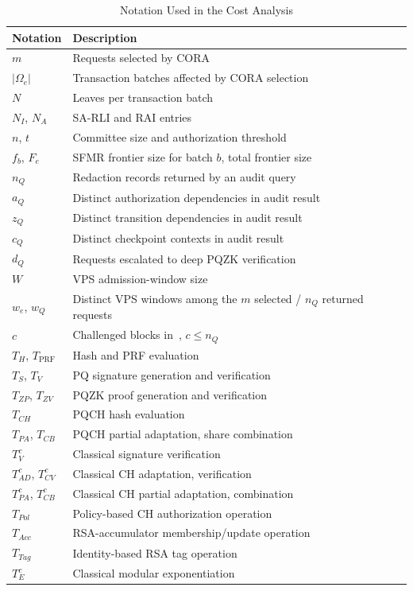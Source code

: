 \documentclass[lettersize,journal]{IEEEtran}
\begin{document}
\begin{table}[t]
\centering
\caption{Notation Used in the Cost Analysis}
\label{tab:cost-notation}
\scriptsize
\renewcommand{\arraystretch}{1.08}
\setlength{\tabcolsep}{3pt}
\begin{tabular}{ll}
\hline
\textbf{Notation} & \textbf{Description} \\
\hline
$m$ & Requests selected by CORA \\
$|\Omega_e|$ & Transaction batches affected by CORA selection \\
$N$ & Leaves per transaction batch \\
$N_I$, $N_A$ & SA-RLI and RAI entries \\
$n$, $t$ & Committee size and authorization threshold \\
$f_b$, $F_e$ & SFMR frontier size for batch $b$, total frontier size \\
$n_Q$ & Redaction records returned by an audit query \\
$a_Q$ & Distinct authorization dependencies in audit result \\
$z_Q$ & Distinct transition dependencies in audit result \\
$c_Q$ & Distinct checkpoint contexts in audit result \\
$d_Q$ & Requests escalated to deep PQZK verification \\
\textcolor{e2}{$W$} & \textcolor{e2}{VPS admission-window size} \\
\textcolor{e2}{$w_e$, $w_Q$} & \textcolor{e2}{Distinct VPS windows among the $m$ selected / $n_Q$ returned requests} \\
$c$ & Challenged blocks in~\cite{ref13}, $c\le n_Q$ \\
\hline
$T_H$, $T_{\mathrm{PRF}}$ & Hash and PRF evaluation \\
$T_S$, $T_V$ & PQ signature generation and verification \\
$T_{ZP}$, $T_{ZV}$ & PQZK proof generation and verification \\
$T_{CH}$ & PQCH hash evaluation \\
$T_{PA}$, $T_{CB}$ & PQCH partial adaptation, share combination \\
$T_V^{c}$ & Classical signature verification \\
$T_{AD}^{c}$, $T_{CV}^{c}$ & Classical CH adaptation, verification \\
$T_{PA}^{c}$, $T_{CB}^{c}$ & Classical CH partial adaptation, combination \\
$T_{Pol}$ & Policy-based CH authorization operation \\
$T_{Acc}$ & RSA-accumulator membership/update operation \\
$T_{Tag}$ & Identity-based RSA tag operation~\cite{ref13} \\
$T_E^{c}$ & Classical modular exponentiation \\
\hline
\end{tabular}
\end{table}
\end{document}
